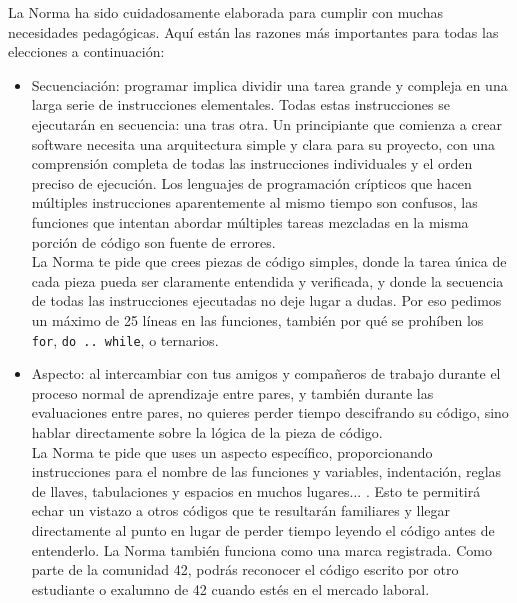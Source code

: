 \documentclass{42-es}
\begin{document}
La Norma ha sido cuidadosamente elaborada para cumplir con muchas
necesidades pedagógicas. Aquí están las razones más importantes para todas las
elecciones a continuación:
\begin{itemize}

      \item Secuenciación: programar implica dividir una tarea grande y
            compleja en una larga serie de instrucciones elementales. Todas
            estas instrucciones se ejecutarán en secuencia: una tras otra. Un
            principiante que comienza a crear software necesita una
            arquitectura
            simple y clara para su proyecto, con una comprensión completa de
            todas las instrucciones individuales y el orden preciso de
            ejecución. Los lenguajes de programación crípticos que hacen
            múltiples instrucciones aparentemente al mismo tiempo son
            confusos, las funciones que intentan abordar múltiples tareas
            mezcladas en la misma porción de código son fuente de errores.\\
            La Norma te pide que crees piezas de código simples, donde la
            tarea única de cada pieza pueda ser claramente entendida y
            verificada, y donde la secuencia de todas las instrucciones
            ejecutadas no deje lugar a dudas. Por eso pedimos un máximo de 25
            líneas en las funciones, también por qué se prohíben los
            \texttt{for}, \texttt{do .. while}, o ternarios.
      \item Aspecto: al intercambiar con tus amigos y compañeros de trabajo
            durante el proceso normal de aprendizaje entre pares, y también
            durante las evaluaciones entre pares, no quieres perder tiempo
            descifrando su código, sino hablar directamente sobre la lógica de
            la pieza de código.\\
            La Norma te pide que uses un aspecto específico, proporcionando
            instrucciones para el nombre de las funciones y variables,
            indentación, reglas de llaves, tabulaciones y espacios en muchos
            lugares... . Esto te permitirá echar un vistazo a otros códigos que
            te resultarán familiares y llegar directamente al punto en lugar de
            perder tiempo leyendo el código antes de entenderlo. La Norma
            también
            funciona como una marca registrada. Como parte de la comunidad 42,
            podrás reconocer el código escrito por otro estudiante o exalumno
            de
            42 cuando estés en el mercado laboral.


\end{itemize}
\end{document}
